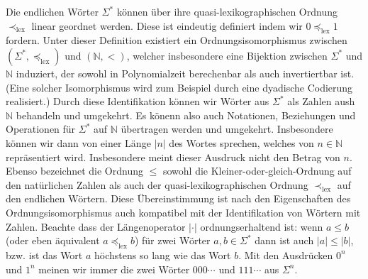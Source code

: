 Die endlichen Wörter $\Sigma^*$ können über ihre quasi-lexikographischen Ordnung $\prec_\mathrm{lex}$ linear geordnet werden. Diese ist eindeutig definiert indem wir $0\preceq_\mathrm{lex} 1$ fordern. Unter dieser Definition existiert ein Ordnungsisomorphismus zwischen $(\Sigma^*,\preceq_\mathrm{lex})$ und $(\mathbb N, <)$, welcher insbesondere eine Bijektion zwischen $\Sigma^*$ und $\mathbb N$ induziert, der sowohl in Polynomialzeit berechenbar als auch invertiertbar ist. (Eine solcher Isomorphismus wird zum Beispiel durch eine dyadische Codierung realisiert.) Durch diese Identifikation können wir Wörter aus $\Sigma^*$ als Zahlen aush $\mathbb N$ behandeln und umgekehrt. Es könenn also auch Notationen, Beziehungen und Operationen für $\Sigma^*$ auf $\mathbb N$ übertragen werden und umgekehrt. Insbesondere können wir dann von einer Länge $|n|$ des Wortes sprechen, welches von $n\in\mathbb N$ repräsentiert wird. Insbesondere meint dieser Ausdruck nicht den Betrag von $n$. Ebenso bezeichnet die Ordnung $\leq$ sowohl die Kleiner-oder-gleich-Ordnung auf den natürlichen Zahlen als auch der quasi-lexikographischen Ordnung $\prec_\mathrm{lex}$ auf den endlichen Wörtern. Diese Übereinstimmung ist nach den Eigenschaften des Ordnungsisomorphismus auch kompatibel mit der Identifikation von Wörtern mit Zahlen. 
Beachte dass der Längenoperator $|\cdot|$ ordnungserhaltend ist: wenn $a\leq b$ (oder eben äquivalent $a\preceq_\mathrm{lex}b$) für zwei Wörter $a,b\in\Sigma^*$ dann ist auch $|a|\leq |b|$, bzw. ist das Wort $a$ höchstens so lang wie das Wort $b$.
Mit den Ausdrücken $0^n$ und $1^n$ meinen wir immer die zwei Wörter $000\cdots$ und $111\cdots$ aus $\Sigma^n$.

